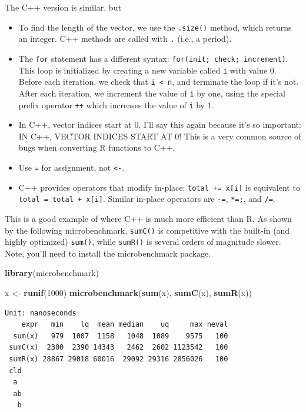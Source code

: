 \documentclass[
]{krantz}
\makeatletter
\newenvironment{Shaded}{\begin{snugshade}}{\end{snugshade}}
\newcommand{\DecValTok}[1]{\textcolor[rgb]{0.06,0.06,0.06}{#1}}
\newcommand{\KeywordTok}[1]{\textcolor[rgb]{0.27,0.27,0.27}{\textbf{#1}}}
\newcommand{\NormalTok}[1]{#1}
\newcommand{\StringTok}[1]{\textcolor[rgb]{0.5,0.5,0.5}{#1}}
\newenvironment{kframe}{%
\medskip{}
\setlength{\fboxsep}{.8em}
 \def\at@end@of@kframe{}%
 \ifinner\ifhmode%
  \def\at@end@of@kframe{\end{minipage}}%
  \begin{minipage}{\columnwidth}%
 \fi\fi%
 \def\FrameCommand##1{\hskip\@totalleftmargin \hskip-\fboxsep
 \colorbox{shadecolor}{##1}\hskip-\fboxsep
     \hskip-\linewidth \hskip-\@totalleftmargin \hskip\columnwidth}%
 \MakeFramed {\advance\hsize-\width
   \@totalleftmargin\z@ \linewidth\hsize
   \@setminipage}}%
 {\par\unskip\endMakeFramed%
 \at@end@of@kframe}
\renewenvironment{Shaded}{\begin{kframe}}{\end{kframe}}
\makeatother
\begin{document}
The C++ version is similar, but

\begin{itemize}
\item
  To find the length of the vector, we use the \texttt{.size()} method, which returns an integer. C++ methods are called with \texttt{.} (i.e., a period).
\item
  The \texttt{for} statement has a different syntax: \texttt{for(init;\ check;\ increment)}. This loop is initialized by creating a new variable called \texttt{i} with value 0. Before each iteration, we check that \texttt{i\ \textless{}\ n}, and terminate the loop if it's not. After each iteration, we increment the value of \texttt{i} by one, using the special prefix operator \texttt{++} which increases the value of \texttt{i} by 1.
\item
  In C++, vector indices start at 0. I'll say this again because it's so important: IN C++, VECTOR INDICES START AT 0! This is a very common source of bugs when converting R functions to C++.
\item
  Use \texttt{=} for assignment, not \texttt{\textless{}-}.
\item
  C++ provides operators that modify in-place: \texttt{total\ +=\ x{[}i{]}} is equivalent to \texttt{total\ =\ total\ +\ x{[}i{]}}. Similar in-place operators are \texttt{-=}, \texttt{*=;}, and \texttt{/=}.
\end{itemize}

This is a good example of where C++ is much more efficient than R. As shown by the following microbenchmark, \texttt{sumC()} is competitive with the built-in (and highly optimized) \texttt{sum()}, while \texttt{sumR()} is several orders of magnitude slower. Note, you'll need to install the microbenchmark package.

\begin{Shaded}
\begin{Highlighting}[]
\KeywordTok{library}\NormalTok{(microbenchmark)}

\NormalTok{x \textless{}{-}}\StringTok{ }\KeywordTok{runif}\NormalTok{(}\DecValTok{1000}\NormalTok{)}
\KeywordTok{microbenchmark}\NormalTok{(}\KeywordTok{sum}\NormalTok{(x), }\KeywordTok{sumC}\NormalTok{(x), }\KeywordTok{sumR}\NormalTok{(x))}
\end{Highlighting}
\end{Shaded}

\begin{verbatim}
Unit: nanoseconds
    expr   min    lq  mean median    uq     max neval
  sum(x)   979  1007  1158   1048  1089    9575   100
 sumC(x)  2300  2390 14343   2462  2602 1123542   100
 sumR(x) 28867 29018 60016  29092 29316 2856026   100
 cld
  a 
  ab
   b
\end{verbatim}
\end{document}
